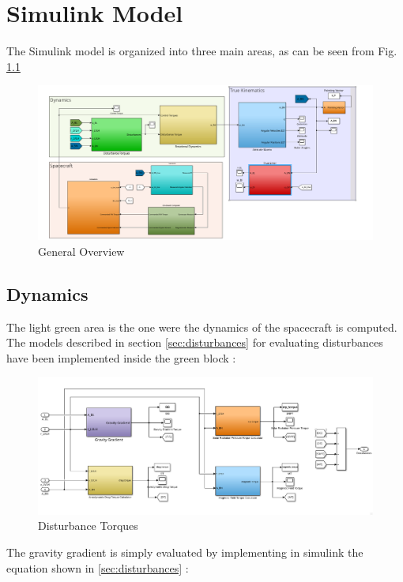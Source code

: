 \documentclass[11pt,a4paper]{report}
\begin{document}
\chapter{Simulink Model}
The Simulink model is organized into three main areas, as can be seen from Fig. \ref{fig:generalovw}

\begin{figure}[H]
 \centering
 \includegraphics[scale=0.4]{gfx/simulink/generalovw.png}
 \caption{General Overview} 
 \label{fig:generalovw}
\end{figure}

\section{Dynamics}
The light green area is the one were the dynamics of the spacecraft is computed.
The models described in section \ref{sec:disturbances} for evaluating disturbances have been implemented inside the green block :

\begin{figure}[H]
 \centering
 \includegraphics[scale=0.4]{gfx/simulink/DistrurbanceTorques.png}
 \caption{Disturbance Torques} 
 \label{fig:disturbancetorques}
\end{figure}

The gravity gradient is simply evaluated by implementing in simulink the equation shown in \ref{sec:disturbances} :
\end{document}
